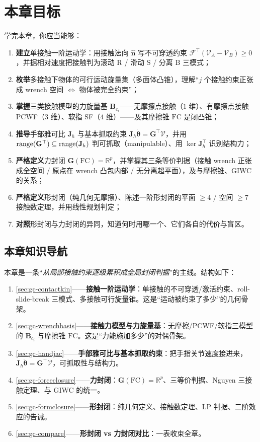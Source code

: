 \section*{本章目标}
学完本章，你应当能够：
\begin{enumerate}
  \item \textbf{建立}单接触一阶运动学：用接触法向 $\hat{\mathbf{n}}$ 写不可穿透约束 $\mathcal{F}^\top(\mathcal{V}_A-\mathcal{V}_B)\ge0$，并据相对速度把接触判为滚动 R / 滑动 S / 分离 B 三模式；
  \item \textbf{枚举}多接触下物体的可行运动旋量集（多面体凸锥），理解“$j$ 个接触约束正张成 wrench 空间 $\Leftrightarrow$ 物体被完全约束”；
  \item \textbf{掌握}三类接触模型的力旋量基 $\mathbf{B}_{c_i}$——无摩擦点接触（$1$ 维）、有摩擦点接触 PCWF（$3$ 维）、软指 SF（$4$ 维）——及其摩擦锥 $\mathrm{FC}$ 是闭凸锥；
  \item \textbf{推导}手部雅可比 $\mathbf{J}_h$ 与基本抓取约束 $\mathbf{J}_h\dot{\boldsymbol{\theta}}=\mathbf{G}^\top\mathcal{V}$，并用 $\operatorname{range}(\mathbf{G}^\top)\subseteq\operatorname{range}(\mathbf{J}_h)$ 判可抓取（manipulable）、用 $\ker\mathbf{J}_h^\top$ 识别结构力；
  \item \textbf{严格定义}力封闭 $\mathbf{G}(\mathrm{FC})=\mathbb{R}^p$，并掌握其三条等价判据（接触 wrench 正张成全空间 / 原点在 wrench 凸包内部 / 无分离超平面），及与摩擦锥、GIWC 的关系；
  \item \textbf{严格定义}形封闭（纯几何无摩擦）、陈述一阶形封闭的平面 $\ge4$ / 空间 $\ge7$ 接触数定理，并用线性规划判定；
  \item \textbf{对照}形封闭与力封闭的异同，知道何时用哪一个、它们各自的代价与盲区。
\end{enumerate}

\subsection*{本章知识导航}
本章是一条“\emph{从局部接触约束逐级累积成全局封闭判据}”的主线。结构如下：
\begin{enumerate}
  \item \cref{sec:gc-contactkin}——\textbf{接触一阶运动学}：单接触的不可穿透/激活约束、roll-slide-break 三模式、多接触可行旋量锥。这是“运动被约束了多少”的几何骨架。
  \item \cref{sec:gc-wrenchbasis}——\textbf{接触力模型与力旋量基}：无摩擦/PCWF/软指三模型的 $\mathbf{B}_{c_i}$ 与摩擦锥 $\mathrm{FC}$。这是“力能施加多少”的对偶骨架。
  \item \cref{sec:gc-handjac}——\textbf{手部雅可比与基本抓取约束}：把手指关节速度接进来，$\mathbf{J}_h\dot{\boldsymbol{\theta}}=\mathbf{G}^\top\mathcal{V}$，可抓取性与结构力。
  \item \cref{sec:gc-forceclosure}——\textbf{力封闭}：$\mathbf{G}(\mathrm{FC})=\mathbb{R}^p$、三等价判据、Nguyen 三接触定理、与 GIWC 的统一。
  \item \cref{sec:gc-formclosure}——\textbf{形封闭}：纯几何定义、接触数定理、LP 判据、二阶效应的告诫。
  \item \cref{sec:gc-compare}——\textbf{形封闭 vs 力封闭对比}：一表收束全章。
\end{enumerate}

